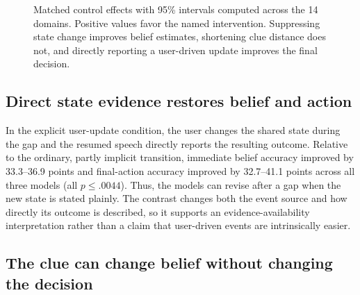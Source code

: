 \documentclass{article}
\begin{document}
\begin{figure}[t]
  \caption{Matched control effects with 95\% intervals computed across the 14 domains. Positive values favor the named intervention. Suppressing state change improves belief estimates, shortening clue distance does not, and directly reporting a user-driven update improves the final decision.}
  \label{fig:mechanism-effects}
\end{figure}

\subsection{Direct state evidence restores belief and action}

In the explicit user-update condition, the user changes the shared state during the gap and the resumed speech directly reports the resulting outcome. Relative to the ordinary, partly implicit transition, immediate belief accuracy improved by 33.3--36.9 points and final-action accuracy improved by 32.7--41.1 points across all three models (all $p\leq.0044$). Thus, the models can revise after a gap when the new state is stated plainly. The contrast changes both the event source and how directly its outcome is described, so it supports an evidence-availability interpretation rather than a claim that user-driven events are intrinsically easier.

\subsection{The clue can change belief without changing the decision}
\end{document}
